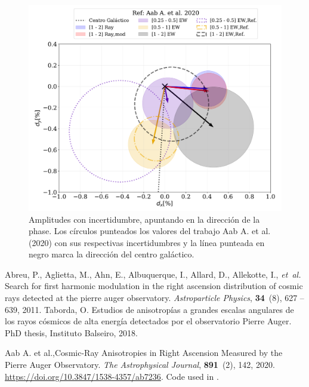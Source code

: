 \documentclass[12pt, doublespace, oneside]{article}
\begin{document}
\begin{figure}[H]
    \begin{small}
        \begin{center}
            \vspace*{-0.21 cm}
            \includegraphics[width=\textwidth]{Figs/comparando_sigmas_v4.pdf}
            \vspace*{-1. cm}
        \end{center}
        \caption{Amplitudes con incertidumbre, apuntando en la dirección  de la phase. Los círculos punteados los valores del trabajo Aab A. et al. (2020) \cite{Aab_2020} con sus respectivas incertidumbres y la línea punteada en negro marca la dirección del centro galáctico.}
        \label{fig:incertidumbre}
    \end{small}
\end{figure}



\begin{thebibliography}{9}
    
  Abreu, P., Aglietta, M., Ahn, E., Albuquerque, I., Allard, D., Allekotte, I.,
    \emph{et~al.}
   Search for first harmonic modulation in the right ascension
    distribution of cosmic rays detected at the pierre auger observatory.
   \emph{Astroparticle Physics}, \textbf{34}~(8), 627 -- 639, 2011.
    Taborda, O. {Estudios de anisotropías a grandes escalas angulares de los rayos
  cósmicos de alta energía detectados por el observatorio Pierre Auger}. PhD thesis, Instituto Balseiro, 2018. 
   
    {Aab A. et al.},{Cosmic-Ray Anisotropies in Right Ascension Measured by the {Pierre   Auger Observatory}}.
    \emph{The Astrophysical Journal}, \textbf{891}~(2), 142, 2020. \url{https://doi.org/10.3847/1538-4357/ab7236}.
    {Code used in \cite{Aab_2020}}.
\end{thebibliography}
    
\end{document}
